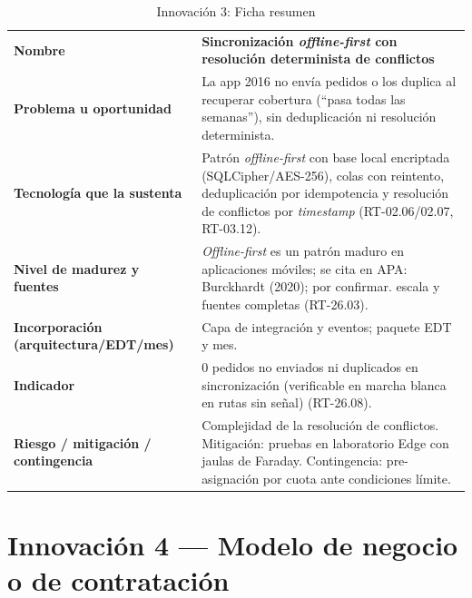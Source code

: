 \begin{table}[htbp]
\centering
\small
\caption{Innovación 3: Ficha resumen}
\label{tab:inn3}
\begin{tabularx}{\textwidth}{@{}L{5.2cm}X@{}}
\toprule
\textbf{Nombre} &
\textbf{Sincronización \emph{offline-first} con resolución determinista de conflictos} \\
\addlinespace
\textbf{Problema u oportunidad} &
La app 2016 no envía pedidos o los duplica al recuperar cobertura (``pasa todas las
semanas''), sin deduplicación ni resolución determinista. \\
\addlinespace
\textbf{Tecnología que la sustenta} &
Patrón \emph{offline-first} con base local encriptada (SQLCipher/AES-256), colas con
reintento, deduplicación por idempotencia y resolución de conflictos por
\emph{timestamp} (RT-02.06/02.07, RT-03.12). \\
\addlinespace
\textbf{Nivel de madurez y fuentes} &
\textit{Offline-first} es un patrón maduro en aplicaciones móviles; se cita en APA:
Burckhardt (2020); por confirmar. \pendiente{} escala y fuentes completas (RT-26.03). \\
\addlinespace
\textbf{Incorporación (arquitectura/EDT/mes)} &
Capa de integración y eventos; \pendiente{} paquete EDT y mes. \\
\addlinespace
\textbf{Indicador} &
0 pedidos no enviados ni duplicados en sincronización (verificable en marcha blanca en
rutas sin señal) (RT-26.08). \\
\addlinespace
\textbf{Riesgo / mitigación / contingencia} &
Complejidad de la resolución de conflictos. Mitigación: pruebas en laboratorio Edge con
jaulas de Faraday. Contingencia: pre-asignación por cuota ante condiciones límite. \\
\bottomrule
\end{tabularx}
\end{table}

\section{Innovación 4 — Modelo de negocio o de contratación}

